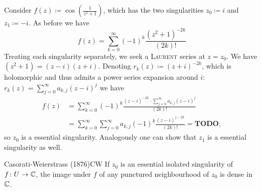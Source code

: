 \documentclass[a4paper,english]{article}
\begin{document}
\begin{exampleB}
    Consider $f(z) \coloneqq \cos\left(\frac{1}{z^2 + 1}\right)$, which has the two singularities $z_0 \coloneqq i$ and $z_1 \coloneqq - i$.
    As before we have
    \begin{equation*}
        f(z)
        = \sum_{k = 0}^{\infty} (-1)^k \frac{(z^2 + 1)^{-2 k}}{(2 k)!}
    \end{equation*}
    Treating each singularity separately, we seek a \textsc{Laurent} series at $z = z_0$.
    We have $(z^2 + 1) = (z - i)(z + i)$.
    Denoting $r_k(z) \coloneqq (z + i)^{-2 k}$, which is holomorphic and thus admits a power series expansion around $i$: $r_k(z) = \sum_{j = 0}^{\infty} a_{k,j} (z - i)^{j}$ we have
    \begin{align*}
        f(z)
        & = \sum_{k = 0}^{\infty} (-1)^k \frac{(z - i)^{-2 k} \cdot  \sum_{j = 0}^{\infty} a_{k,j} (z - i)^{j}}{(2 k)!} \\
        & = \sum_{k = 0}^{\infty} \sum_{j = 0}^{\infty} a_{k,j} (-1)^k \frac{(z - i)^{j-2 k} }{(2 k)!}
        = \textbf{TODO},
    \end{align*}
    so $z_0$ is a essential singularity.
    Analogously one can show that $z_1$ is a essential singularity as well.
\end{exampleB}

\begin{thm}{Casorati-Weierstrass (1876)}{CW}
    If $z_0$ is an essential isolated singularity of $f \colon U \to \operatorname{\mathbb{C}}$, the image under $f$ of any punctured neighbourhood of $z_0$ is dense in $\operatorname{\mathbb{C}}$. 
\end{thm}
\end{document}
